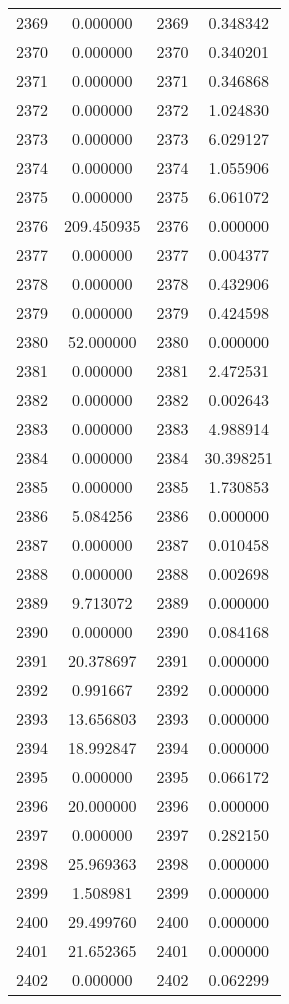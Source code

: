 \documentclass[12pt]{article}
\begin{document}
\begin{longtable}{@{}cccc@{}}
2369 & 0.000000 & 2369 & 0.348342 \\
2370 & 0.000000 & 2370 & 0.340201 \\
2371 & 0.000000 & 2371 & 0.346868 \\
2372 & 0.000000 & 2372 & 1.024830 \\
2373 & 0.000000 & 2373 & 6.029127 \\
2374 & 0.000000 & 2374 & 1.055906 \\
2375 & 0.000000 & 2375 & 6.061072 \\
2376 & 209.450935 & 2376 & 0.000000 \\
2377 & 0.000000 & 2377 & 0.004377 \\
2378 & 0.000000 & 2378 & 0.432906 \\
2379 & 0.000000 & 2379 & 0.424598 \\
2380 & 52.000000 & 2380 & 0.000000 \\
2381 & 0.000000 & 2381 & 2.472531 \\
2382 & 0.000000 & 2382 & 0.002643 \\
2383 & 0.000000 & 2383 & 4.988914 \\
2384 & 0.000000 & 2384 & 30.398251 \\
2385 & 0.000000 & 2385 & 1.730853 \\
2386 & 5.084256 & 2386 & 0.000000 \\
2387 & 0.000000 & 2387 & 0.010458 \\
2388 & 0.000000 & 2388 & 0.002698 \\
2389 & 9.713072 & 2389 & 0.000000 \\
2390 & 0.000000 & 2390 & 0.084168 \\
2391 & 20.378697 & 2391 & 0.000000 \\
2392 & 0.991667 & 2392 & 0.000000 \\
2393 & 13.656803 & 2393 & 0.000000 \\
2394 & 18.992847 & 2394 & 0.000000 \\
2395 & 0.000000 & 2395 & 0.066172 \\
2396 & 20.000000 & 2396 & 0.000000 \\
2397 & 0.000000 & 2397 & 0.282150 \\
2398 & 25.969363 & 2398 & 0.000000 \\
2399 & 1.508981 & 2399 & 0.000000 \\
2400 & 29.499760 & 2400 & 0.000000 \\
2401 & 21.652365 & 2401 & 0.000000 \\
2402 & 0.000000 & 2402 & 0.062299 \\

\end{longtable}
\end{document}
